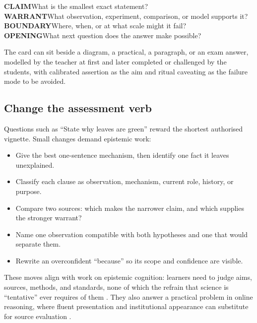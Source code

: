 \begin{center}
\large
\begin{tcolorbox}[width=.9\linewidth,colback=white,colframe=night,boxrule=.85pt,arc=2mm,left=5mm,right=5mm,top=3mm,bottom=3mm]
\textcolor{night}{\textbf{CLAIM}}\quad What is the smallest exact statement?\\[1.5mm]
\textcolor{water}{\textbf{WARRANT}}\quad What observation, experiment, comparison, or model supports it?\\[1.5mm]
\textcolor{autumn}{\textbf{BOUNDARY}}\quad Where, when, or at what scale might it fail?\\[1.5mm]
\textcolor{leaf}{\textbf{OPENING}}\quad What next question does the answer make possible?
\end{tcolorbox}
\end{center}

The card can sit beside a diagram, a practical, a paragraph, or an exam answer, modelled by the teacher at first and later completed or challenged by the students, with calibrated assertion as the aim and ritual caveating as the failure mode to be avoided.

\subsection{Change the assessment verb}

Questions such as ``State why leaves are green'' reward the shortest authorised vignette. Small changes demand epistemic work:

\begin{itemize}
  \item Give the best one-sentence mechanism, then identify one fact it leaves unexplained.
  \item Classify each clause as observation, mechanism, current role, history, or purpose.
  \item Compare two sources: which makes the narrower claim, and which supplies the stronger warrant?
  \item Name one observation compatible with both hypotheses and one that would separate them.
  \item Rewrite an overconfident ``because'' so its scope and confidence are visible.
\end{itemize}

These moves align with work on epistemic cognition: learners need to judge aims, sources, methods, and standards, none of which the refrain that science is ``tentative'' ever requires of them \citep{chinn2011}. They also answer a practical problem in online reasoning, where fluent presentation and institutional appearance can substitute for source evaluation \citep{mcgrew2018}.

